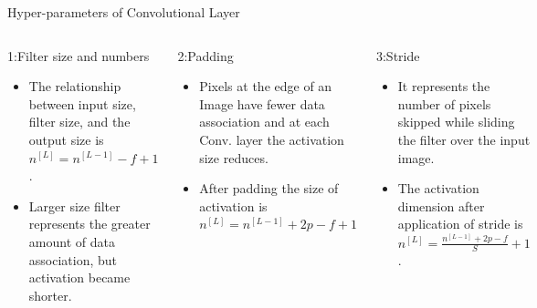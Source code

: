 \documentclass[10pt]{beamer}
\begin{document}
\begin{frame}{Hyper-parameters of Convolutional Layer}
    \begin{columns}
        \begin{block}{1:Filter size and numbers}
          \begin{itemize}
              \item The relationship between input size, filter size, and the output size is $n^{[L]}=n^{[L-1]}-f+1$.
              \item Larger size filter represents the greater amount of data association, but activation became shorter.        
          \end{itemize}
        \end{block}
        
        \begin{block}{2:Padding}
           \begin{itemize}
               \item Pixels at the edge of an Image have fewer data association and at each Conv. layer the activation size reduces. 
               \item After padding the size of activation is $n^{[L]}=n^{[L-1]}+2p-f+1$  
           \end{itemize}
        \end{block}

        \begin{block}{3:Stride}
            \begin{itemize}
                \item It represents the number of pixels skipped while sliding the filter over the input image. 
                \item The activation dimension after application of stride is $n^{[L]}=\frac{n^{[L-1]}+2 p-f}{S}+1$. 
            \end{itemize}
        \end{block} 
        
        \begin{example}
             \begin{figure}
                  \centering
                   \includegraphics[width=0.6\textwidth]{Images/padding.png}
            \end{figure}
        \end{example}
    \end{columns}
\end{frame}
\end{document}
